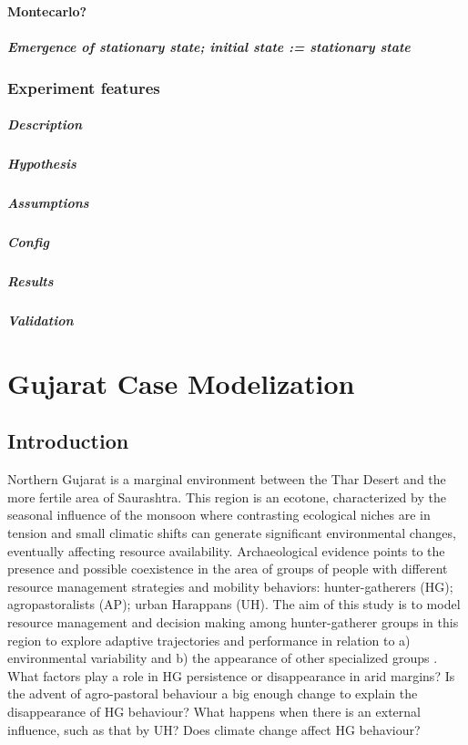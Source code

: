 \documentclass[11pt,oneside,a4paper,openright]{report}
\begin{document}
			\subsubsection{Montecarlo?} 
			\paragraph{Emergence of stationary state; initial state := stationary state}
		\subsection{Experiment features}
			\paragraph{Description}
			\paragraph{Hypothesis}
			\paragraph{Assumptions}
			\paragraph{Config}
			\paragraph{Results}
			\paragraph{Validation}

\newpage 
\chapter{Gujarat Case Modelization} %
	\section{Introduction}
Northern Gujarat is a marginal environment between the Thar Desert and the more fertile area of Saurashtra. This region is an ecotone, characterized by the seasonal influence of the monsoon where contrasting ecological niches are in tension and small climatic shifts can generate significant environmental changes, eventually affecting  resource availability. Archaeological evidence points to the presence and possible coexistence in the area of groups of people with different resource management strategies and mobility behaviors: hunter-gatherers (HG); agropastoralists (AP); urban Harappans (UH).
The aim of this study is to model resource management and decision making among hunter-gatherer groups in this region to explore adaptive trajectories and performance in relation to a) environmental variability and b) the appearance of other specialized groups . 
What factors play a role in HG persistence or disappearance in arid margins? Is the advent of agro-pastoral behaviour a big enough change to explain the disappearance of HG behaviour? What happens when there is an external influence, such as that by UH? Does climate change affect HG behaviour?
\end{document}
